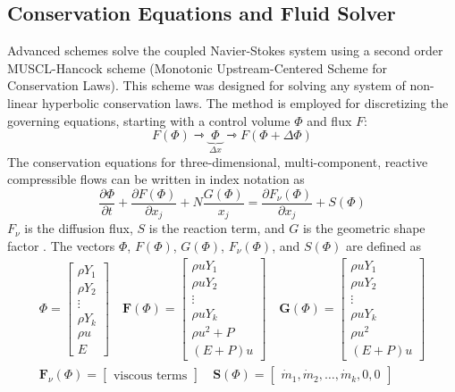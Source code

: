 \documentclass[letterpaper,twocolumn,10pt]{article}
\begin{document}
\subsection{Conservation Equations and Fluid Solver}
Advanced schemes solve the coupled Navier-Stokes system using a second order MUSCL-Hancock scheme (Monotonic Upstream-Centered Scheme for Conservation Laws). This scheme was designed for solving any system of non-linear hyperbolic conservation laws. The method is employed for discretizing the governing equations, starting with a control volume $\Phi$ and flux $F$:
$$F(\Phi) \rightarrowtriangle \underbrace{\boxed{ \; \Phi \; }}_{\Delta x} \rightarrowtriangle F(\Phi + \Delta \Phi)$$ 
The conservation equations for three-dimensional, multi-component, reactive compressible flows can be written in index notation as
$$ \frac{\partial \Phi}{\partial t} + \frac{\partial F (\Phi)}{\partial x_j} + N \frac{G (\Phi)}{x_j} = \frac{\partial F_\nu (\Phi)}{\partial x_j} + S (\Phi) $$
$F_\nu$ is the diffusion flux, $S$ is the reaction term, and $G$ is the geometric shape factor \cite{Chen_thesis}. The vectors $\Phi$, $F (\Phi)$, $G (\Phi)$, $F_\nu(\Phi)$, and $S (\Phi)$ are defined as
\begin{multline*}
    \Phi = \begin{bmatrix}
    \rho Y_1 \\
    \rho Y_2 \\
    \vdots \\
    \rho Y_k \\
    \rho u \\
    E
    \end{bmatrix} \quad
    \textbf{F}(\Phi) = \begin{bmatrix}
    \rho u Y_1 \\
    \rho u Y_2 \\
    \vdots \\
    \rho u Y_k \\
    \rho {u}^2 + P \\
    (E + P) u
    \end{bmatrix} \quad
    \textbf{G}(\Phi) = \begin{bmatrix}
    \rho u Y_1 \\
    \rho u Y_2 \\
    \vdots \\
    \rho u Y_k \\
    \rho {u}^2 \\
    (E + P) u
    \end{bmatrix} \\
    \textbf{F$_\nu$}(\Phi) = \begin{bmatrix}
    \textrm{viscous terms}
    \end{bmatrix} \quad
    \textbf{S}(\Phi) = \begin{bmatrix}
    \dot{m}_1, \dot{m}_2, \dots, \dot{m}_k , 0 , 0
    \end{bmatrix}
\end{multline*}
\end{document}
